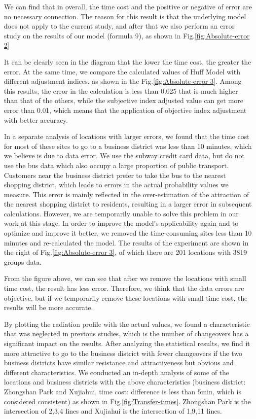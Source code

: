 \documentclass[journal]{IEEEtran}
\begin{document}
We can find that in overall, the time cost and the positive or negative of error are no necessary connection. The reason for this result is that the underlying model does not apply to the current study, and after that we also perform an error study on the results of our model (formula 9), as shown in Fig.\ref{fig:Absolute-error 2}

It can be clearly seen in the diagram that the lower the time cost, the greater the error. At the same time, we compare the calculated values of Huff Model with different adjustment indices, as shown in the Fig.\ref{fig:Absolute-error 3}. Among this results, the error in the calculation is less than 0.025 that is much higher than that of the others, while the subjective index adjusted value can get more error than 0.01, which means that the application of objective index adjustment with better accuracy.

In a separate analysis of locations with larger errors, we found that the time cost for most of these sites to go to a business district was less than 10 minutes, which we believe is due to data error. We use the subway credit card data, but do not use the bus data which also occupy a large proportion of public transport. Customers near the business district prefer to take the bus to the nearest shopping district, which leads to errors in the actual probability values we measure. This error is mainly reflected in the over-estimation of the attraction of the nearest shopping district to residents, resulting in a larger error in subsequent calculations. However, we are temporarily unable to solve this problem in our work at this stage. In order to improve the model's applicability again and to optimize and improve it better, we removed the time-consuming sites less than 10 minutes and re-calculated the model. The results of the experiment are shown in the right of Fig.\ref{fig:Absolute-error 3}, of which there are 201 locations with 3819 groups data.

From the figure above, we can see that after we remove the locations with small time cost, the result has less error. Therefore, we think that the data errors are objective, but if we temporarily remove these locations with small time cost, the results will be more accurate.

By plotting the radiation profile with the actual values, we found a characteristic that was neglected in previous studies, which is the number of changeovers has a significant impact on the results. After analyzing the statistical results, we find it more attractive to go to the business district with fewer changeovers if the two business districts have similar resistance and attractiveness but obvious and different characteristics. We conducted an in-depth analysis of some of the locations and business districts with the above characteristics (business district: Zhongshan Park and Xujiahui, time cost: difference is less than 5min, which is considered consistent) as shown in Fig.\ref{fig:Transfer-times}. Zhongshan Park is the intersection of 2,3,4 lines and Xujiahui is the intersection of 1,9,11 lines.
\end{document}
